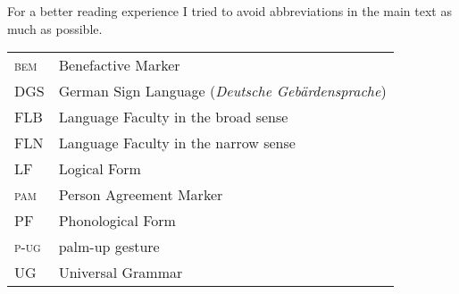 \begin{refsection}

For a better reading experience I tried to avoid abbreviations in the main text as much as possible.  \\

\begin{tabular}{L{2.5cm}L{9.5cm}}
\textsc{bem} &  Benefactive Marker \\
DGS & German Sign Language (\textit{Deutsche Geb\"ardensprache})\\
FLB & Language Faculty in the broad sense\\
FLN & Language Faculty in the narrow sense\\
LF & Logical Form \\
\textsc{pam} & Person Agreement Marker \\
PF & Phonological Form \\
\textsc{p-ug} & palm-up gesture\\
UG & Universal Grammar \\


\end{tabular}

\printbibliography[heading=subbibliography]
\end{refsection}